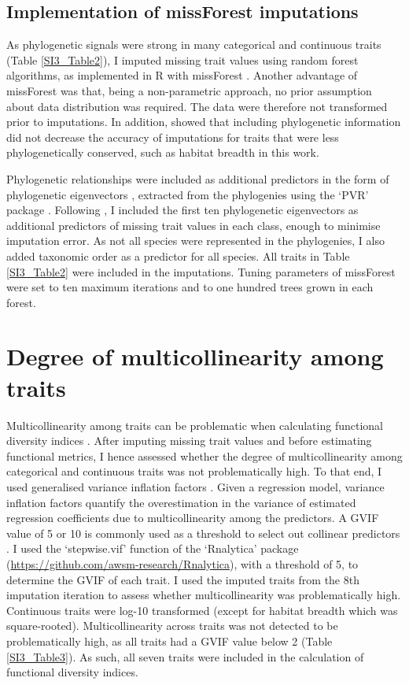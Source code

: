 \subsection{Implementation of missForest imputations}
As phylogenetic signals were strong in many categorical and continuous traits (Table \ref{SI3_Table2}), I imputed missing trait values using random forest algorithms, as implemented in R with missForest \citep{Stekhoven2012, Stekhoven2016}. Another advantage of missForest was that, being a non-parametric approach, no prior assumption about data distribution was required. The data were therefore not transformed prior to imputations. In addition, \citet{Penone2014} showed that including phylogenetic information did not decrease the accuracy of imputations for traits that were less phylogenetically conserved, such as habitat breadth in this work. 

Phylogenetic relationships were included as additional predictors in the form of phylogenetic eigenvectors \citep{DinizFilho2012}, extracted from the phylogenies using the `PVR' package \citep{Santos2018}. Following \citet{Penone2014}, I included the first ten phylogenetic eigenvectors as additional predictors of missing trait values in each class, enough to minimise imputation error. As not all species were represented in the phylogenies, I also added taxonomic order as a predictor for all species. All traits in Table \ref{SI3_Table2} were included in the imputations. Tuning parameters of missForest were set to ten maximum iterations and to one hundred trees grown in each forest. 

\section{Degree of multicollinearity among traits}
Multicollinearity among traits can be problematic when calculating functional diversity indices \citep{Cadotte2011}. After imputing missing trait values and before estimating functional metrics, I hence assessed whether the degree of multicollinearity among categorical and continuous traits was not problematically high. To that end, I used generalised variance inflation factors \citep{Fox1992}. Given a regression model, variance inflation factors quantify the overestimation in the variance of estimated regression coefficients due to multicollinearity among the predictors. A GVIF value of 5 or 10 is commonly used as a threshold to select out collinear predictors \citep{Dormann2013}. I used the `stepwise.vif' function of the `Rnalytica' package (\url{https://github.com/awsm-research/Rnalytica}), with a threshold of 5, to determine the GVIF of each trait. I used the imputed traits from the 8th imputation iteration to assess whether multicollinearity was problematically high. Continuous traits were log-10 transformed (except for habitat breadth which was square-rooted). Multicollinearity across traits was not detected to be problematically high, as all traits had a GVIF value below 2 (Table \ref{SI3_Table3}). As such, all seven traits were included in the calculation of functional diversity indices.


